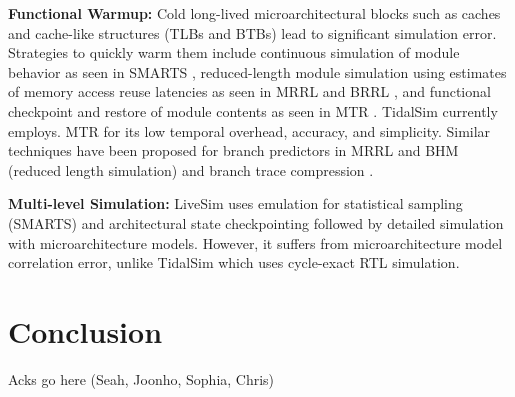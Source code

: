 \documentclass[sigplan,nonacm,10pt]{acmart}
\begin{document}
\textbf{Functional Warmup:} Cold long-lived microarchitectural blocks such as caches and cache-like structures (TLBs and BTBs) lead to significant simulation error. Strategies to quickly warm them include continuous simulation of module behavior as seen in SMARTS \cite{wunderlich2003smarts}, reduced-length module simulation using estimates of memory access reuse latencies as seen in MRRL \cite{haskins2003memory} and BRRL \cite{eeckhout2005blrl}, and functional checkpoint and restore of module contents as seen in MTR \cite{barr2005accelerating}. TidalSim currently employs. MTR for its low temporal overhead, accuracy, and simplicity. 
Similar techniques have been proposed for branch predictors in MRRL and BHM \cite{kluyskens2007branch} (reduced length simulation) and branch trace compression \cite{barr2006branch}.

\textbf{Multi-level Simulation:} LiveSim \cite{hassani2016livesim} uses emulation for statistical sampling (SMARTS) and architectural state checkpointing followed by detailed simulation with microarchitecture models. However, it suffers from microarchitecture model correlation error, unlike TidalSim which uses cycle-exact RTL simulation. 

\section{Conclusion}


\begin{acks}
Acks go here (Seah, Joonho, Sophia, Chris)
\end{acks}




\end{document}
